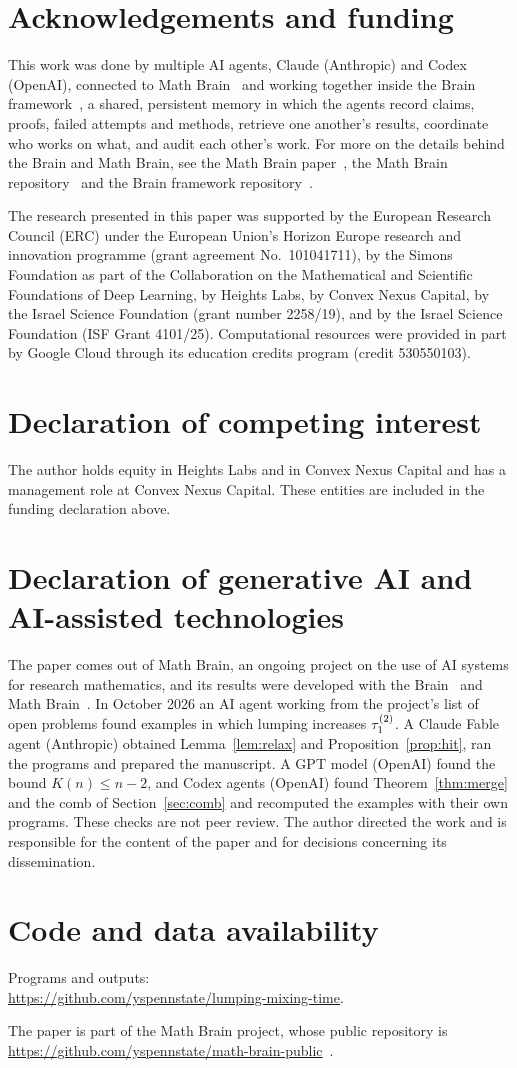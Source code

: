 \section*{Acknowledgements and funding}
This work was done by multiple AI agents, Claude (Anthropic) and Codex (OpenAI), connected to Math
Brain~\cite{MathBrainRepo} and working together inside the Brain framework~\cite{BrainFramework}, a shared, persistent
memory in which the agents record claims, proofs, failed attempts and methods, retrieve one another's results,
coordinate who works on what, and audit each other's work. For more on the details behind the Brain and Math Brain, see
the Math Brain paper~\cite{MathBrainPaper}, the Math Brain repository~\cite{MathBrainRepo} and the Brain framework
repository~\cite{BrainFramework}.

The research presented in this paper was supported by the European Research Council (ERC) under the European Union's
Horizon Europe research and innovation programme (grant agreement No.~101041711), by the Simons Foundation as part of
the Collaboration on the Mathematical and Scientific Foundations of Deep Learning, by Heights Labs, by Convex Nexus
Capital, by the Israel Science Foundation (grant number 2258/19), and by the Israel Science Foundation (ISF Grant
4101/25). Computational resources were provided in part by Google Cloud through its education credits program (credit
530550103).

\section*{Declaration of competing interest}
The author holds equity in Heights Labs and in Convex Nexus Capital and has a management role at Convex Nexus Capital.
These entities are included in the funding declaration above.

\section*{Declaration of generative AI and AI-assisted technologies}
The paper comes out of Math Brain, an ongoing project on the use of AI systems for research mathematics, and its
results were developed with the Brain~\cite{BrainFramework} and Math Brain~\cite{MathBrainRepo}. In October 2026 an AI agent working from the project's list of open problems found examples in which
lumping increases $\tau_1^{(2)}$. A Claude Fable agent (Anthropic) obtained Lemma~\ref{lem:relax} and
Proposition~\ref{prop:hit}, ran the programs and prepared the manuscript. A GPT model (OpenAI) found the bound
$K(n)\le n-2$, and Codex agents (OpenAI) found Theorem~\ref{thm:merge} and the comb of Section~\ref{sec:comb} and
recomputed the examples with their own programs. These checks are not
peer review. The author directed the work and is responsible for the content of the paper and for decisions
concerning its dissemination.

\section*{Code and data availability}
Programs and outputs:\\
\url{https://github.com/yspennstate/lumping-mixing-time}.

The paper is part of the Math Brain project, whose public repository is
\url{https://github.com/yspennstate/math-brain-public}~\cite{MathBrainRepo}.
